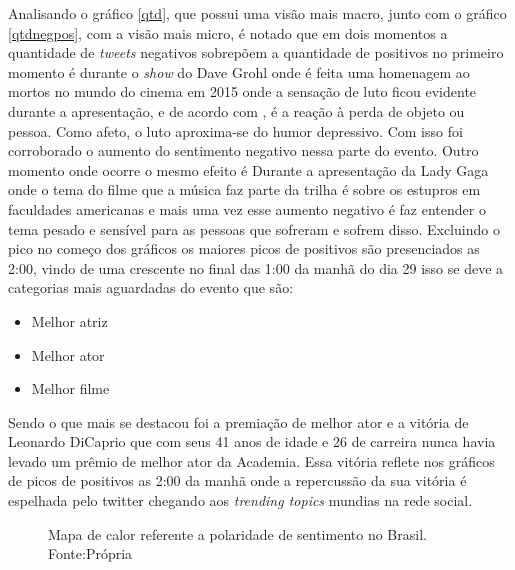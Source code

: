 Analisando o gráfico \ref{qtd}, que possui uma visão mais macro, junto com o gráfico \ref{qtdnegpos}, com a visão mais micro, é notado que em dois momentos a quantidade de \textit{tweets} negativos sobrepõem a quantidade de positivos no primeiro momento é durante o \textit{show} do Dave Grohl onde é feita uma homenagem ao mortos no mundo do cinema em 2015 onde a sensação de luto ficou evidente durante a apresentação, e de acordo com \cite{freud1908conferencias}, é a reação à perda de objeto ou pessoa. Como afeto, o luto aproxima-se do humor depressivo. Com isso foi corroborado o aumento do sentimento negativo nessa parte do evento. Outro momento onde ocorre o mesmo efeito é Durante a apresentação da Lady Gaga onde o tema do filme que a  música faz parte da trilha é sobre os estupros em faculdades americanas e mais uma vez esse aumento negativo é faz entender o tema pesado e sensível para as pessoas que sofreram e sofrem disso. Excluindo o pico no começo dos gráficos os maiores picos de positivos são presenciados as 2:00, vindo de uma crescente no final das 1:00 da manhã do dia 29 isso se deve a categorias mais aguardadas do evento que são:

 \begin{itemize}
 	\item Melhor atriz
 	\item Melhor ator
 	\item Melhor filme
 \end{itemize}

Sendo o que mais se destacou foi a premiação de melhor ator e a vitória de Leonardo DiCaprio que com seus 41 anos de idade e 26 de carreira nunca havia levado um prêmio de melhor ator da Academia. Essa vitória reflete nos gráficos de picos de positivos as 2:00 da manhã onde a repercussão da sua vitória é espelhada pelo twitter chegando aos \textit{trending topics} mundias na rede social.


\begin{figure}[!h]
	\centering{}
	\caption{Mapa de calor referente a polaridade de sentimento no Brasil. Fonte:Própria}
	\label{mapa}
\end{figure}